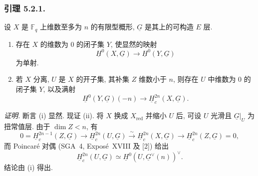 \subsubsection*{引理 5.2.1.}
设 $X$ 是 $\mathbb F_q$ 上维数至多为 $n$ 的有限型概形,
$\underline G$ 是其上的可构造 $E$ 层.

\begin{enumerate}[label=(\roman*)]
\item 存在 $X$ 的维数为 $0$ 的闭子集 $Y$, 使显然的映射
  \[
  \underline H^0(X,\underline G)\longrightarrow
  \underline H^0(Y,\underline G)
  \]
  为单射.
\item 若 $X$ 分离, $U$ 是 $X$ 的开子集, 其补集 $Z$ 维数小于 $n$,
  则存在 $U$ 中维数为 $0$ 的闭子集 $Y$, 以及满射
  \[
  \underline H^0(Y,\underline G)(-n)\longrightarrow
  \underline H_c^{2n}(X,\underline G).
  \]
\end{enumerate}

\medskip
\noindent\emph{证明.}
断言 (i) 显然. 现证 (ii). 将 $X$ 换成 $X_{\mathrm{red}}$ 并缩小 $U$ 后,
可设 $U$ 光滑且 $\underline G|_U$ 为扭常值层. 由于 $\dim Z<n$, 有
\[
0=\underline H_c^{2n-1}(Z,\underline G)
\longrightarrow \underline H_c^{2n}(U,\underline G)
\xrightarrow{\sim}\underline H_c^{2n}(X,\underline G)
\longrightarrow \underline H_c^{2n}(Z,\underline G)=0,
\]
而 Poincar\'e 对偶 (SGA~4, Expos\'e~XVIII 及 [2]) 给出
\[
\underline H_c^{2n}(U,\underline G)\simeq
\underline H^0(U,\underline G^\vee(n))^\vee.
\]
结论由 (i) 得出.

